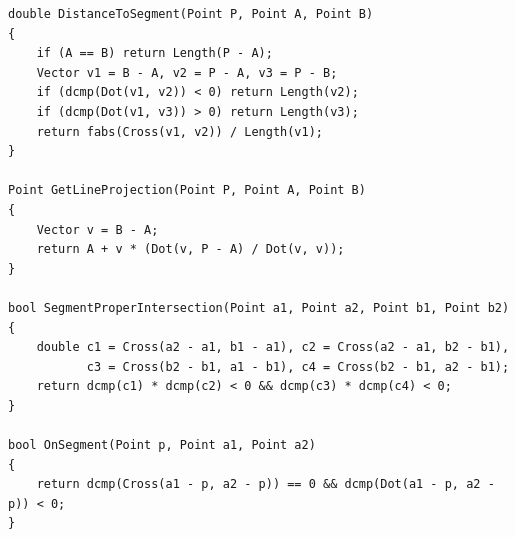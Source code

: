 \documentclass[twoside]{article}
\begin{document}
\begin{lstlisting}
double DistanceToSegment(Point P, Point A, Point B)
{
    if (A == B) return Length(P - A);
    Vector v1 = B - A, v2 = P - A, v3 = P - B;
    if (dcmp(Dot(v1, v2)) < 0) return Length(v2);
    if (dcmp(Dot(v1, v3)) > 0) return Length(v3);
    return fabs(Cross(v1, v2)) / Length(v1);
}

Point GetLineProjection(Point P, Point A, Point B)
{
    Vector v = B - A;
    return A + v * (Dot(v, P - A) / Dot(v, v));
}

bool SegmentProperIntersection(Point a1, Point a2, Point b1, Point b2)
{
    double c1 = Cross(a2 - a1, b1 - a1), c2 = Cross(a2 - a1, b2 - b1),
           c3 = Cross(b2 - b1, a1 - b1), c4 = Cross(b2 - b1, a2 - b1);
    return dcmp(c1) * dcmp(c2) < 0 && dcmp(c3) * dcmp(c4) < 0;
}

bool OnSegment(Point p, Point a1, Point a2)
{
    return dcmp(Cross(a1 - p, a2 - p)) == 0 && dcmp(Dot(a1 - p, a2 - p)) < 0;
}
\end{lstlisting}
\end{document}
